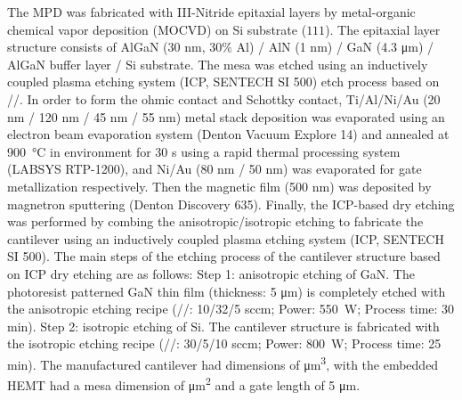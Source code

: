 The  MPD was fabricated with III-Nitride  epitaxial layers  by metal-organic chemical vapor deposition (MOCVD)  on Si substrate ($111$). The epitaxial layer structure consists of AlGaN (30 \unit{\nm}, 30$\%$ Al) / AlN (1 \unit{\nm}) / GaN (4.3 \unit{\um}) / AlGaN buffer layer / Si substrate. The mesa was etched using an inductively coupled plasma etching system (ICP, SENTECH SI 500) etch process based on //. In order to form the ohmic  contact and Schottky  contact, Ti/Al/Ni/Au (20 \unit{\nm} / 120 \unit{\nm} / 45 \unit{\nm} / 55 \unit{\nm}) metal stack deposition was evaporated using an electron beam evaporation  system (Denton Vacuum Explore 14) and annealed at \SI{900}{\degreeCelsius} in  environment for 30 \unit{\s} using a rapid thermal processing  system (LABSYS RTP-1200), and Ni/Au (80 \unit{\nm} / 50 \unit{\nm}) was evaporated for gate metallization respectively. Then the magnetic film  (500 \unit{\nm}) was deposited by magnetron sputtering  (Denton Discovery 635). Finally, the ICP-based dry etching was performed by combing the  anisotropic/isotropic etching  to fabricate the cantilever  using an inductively coupled plasma etching  system (ICP, SENTECH SI 500). The main steps of the etching process of the cantilever  structure based on ICP dry etching  are as follows: Step 1: anisotropic etching of GaN. The photoresist patterned GaN thin film (thickness: 5 \unit{\um}) is completely etched with the anisotropic etching recipe (//: 10/32/5 sccm; Power: \SI{550}{\watt}; Process time: 30 \unit{\minute}). Step 2: isotropic etching of Si. The cantilever  structure is fabricated with the isotropic etching recipe (//: 30/5/10 sccm; Power: \SI{800}{\watt}; Process time: 25 \unit{\minute}). The manufactured cantilever  had dimensions of  \unit{\cubic\um}, with the embedded HEMT had a mesa dimension of  \unit{\square\um} and a gate length of 5 \unit{\um}.

